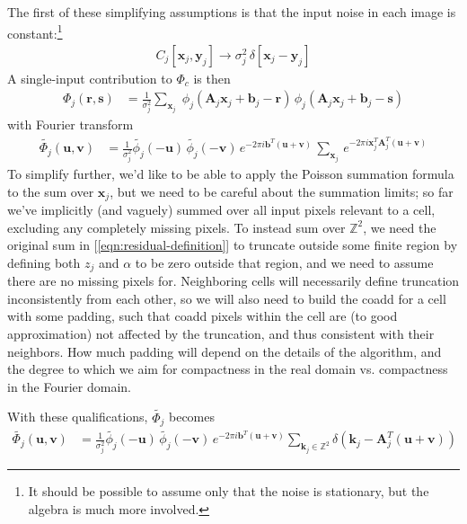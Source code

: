 \documentclass[DM,authoryear,toc]{lsstdoc}
\begin{document}
The first of these simplifying assumptions is that the input noise in each image is constant:\footnote{It should be possible to assume only that the noise is stationary, but the algebra is much more involved.}
\begin{align}
    C_j[\symbf{x}_j, \symbf{y}_j] \rightarrow \sigma_j^2 \, \delta[\symbf{x}_j-\symbf{y}_j]
\end{align}
A single-input contribution to $\Phi_c$ is then
\begin{align}
    \Phi_j(\symbf{r}, \symbf{s}) &= \frac{1}{\sigma_j^2} \sum_{\symbf{x}_j} \;
        ϕ_j\!\left(\symbf{A}_j\symbf{x}_j + \symbf{b}_j - \symbf{r}\right) \,
        ϕ_j\!\left(\symbf{A}_j\symbf{x}_j + \symbf{b}_j - \symbf{s}\right)
\end{align}
with Fourier transform
\begin{align}
    \widetilde{\Phi_j}(\symbf{u}, \symbf{v}) &= \frac{1}{\sigma_j^2}
        \widetilde{\phi_j}(-\symbf{u}) \, \widetilde{\phi_j}(-\symbf{v}) \,
        e^{-2\pi i \symbf{b}^T(\symbf{u}+\symbf{v})} \,
        \sum_{\symbf{x}_j} \, e^{-2\pi i \symbf{x}_j^{T} \symbf{A}_j^T (\symbf{u} + \symbf{v})}
\end{align}
To simplify further, we'd like to be able to apply the Poisson summation formula to the sum over $\symbf{x}_j$, but we need to be careful about the summation limits; so far we've implicitly (and vaguely) summed over all input pixels relevant to a cell, excluding any completely missing pixels.
To instead sum over $\mathbb{Z}^2$, we need the original sum in [\ref{eqn:residual-definition}] to truncate outside some finite region by defining both $z_j$ and $\alpha$ to be zero outside that region, and we need to assume there are no missing pixels for.
Neighboring cells will necessarily define truncation inconsistently from each other, so we will also need to build the coadd for a cell with some padding, such that coadd pixels within the cell are (to good approximation) not affected by the truncation, and thus consistent with their neighbors.
How much padding will depend on the details of the algorithm, and the degree to which we aim for compactness in the real domain vs. compactness in the Fourier domain.

With these qualifications, $\widetilde{\Phi_j}$ becomes
\begin{align}
    \widetilde{\Phi_j}(\symbf{u}, \symbf{v}) &= \frac{1}{\sigma_j^2}
        \widetilde{\phi_j}(-\symbf{u}) \, \widetilde{\phi_j}(-\symbf{v}) \,
        e^{-2\pi i \symbf{b}^T(\symbf{u}+\symbf{v})} \!
        \sum_{\symbf{k}_j \in \mathbb{Z}^2}
            \delta\left(\symbf{k}_j - \symbf{A}_j^T (\symbf{u} + \symbf{v}) \right)
\end{align}
\end{document}

